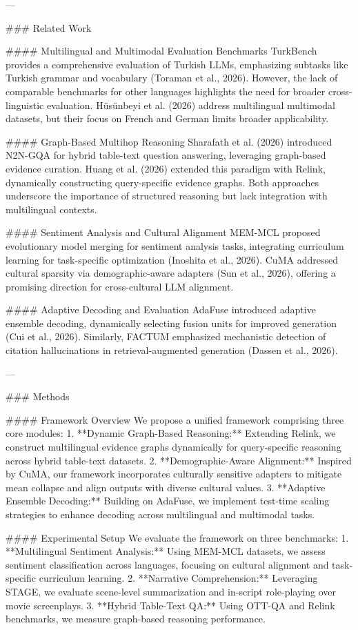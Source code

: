 ---

### Related Work

#### Multilingual and Multimodal Evaluation Benchmarks
TurkBench provides a comprehensive evaluation of Turkish LLMs, emphasizing subtasks like Turkish grammar and vocabulary (Toraman et al., 2026). However, the lack of comparable benchmarks for other languages highlights the need for broader cross-linguistic evaluation. Hüsünbeyi et al. (2026) address multilingual multimodal datasets, but their focus on French and German limits broader applicability.

#### Graph-Based Multihop Reasoning
Sharafath et al. (2026) introduced N2N-GQA for hybrid table-text question answering, leveraging graph-based evidence curation. Huang et al. (2026) extended this paradigm with Relink, dynamically constructing query-specific evidence graphs. Both approaches underscore the importance of structured reasoning but lack integration with multilingual contexts.

#### Sentiment Analysis and Cultural Alignment
MEM-MCL proposed evolutionary model merging for sentiment analysis tasks, integrating curriculum learning for task-specific optimization (Inoshita et al., 2026). CuMA addressed cultural sparsity via demographic-aware adapters (Sun et al., 2026), offering a promising direction for cross-cultural LLM alignment.

#### Adaptive Decoding and Evaluation
AdaFuse introduced adaptive ensemble decoding, dynamically selecting fusion units for improved generation (Cui et al., 2026). Similarly, FACTUM emphasized mechanistic detection of citation hallucinations in retrieval-augmented generation (Dassen et al., 2026).

---

### Methods

#### Framework Overview
We propose a unified framework comprising three core modules:
1. **Dynamic Graph-Based Reasoning:** Extending Relink, we construct multilingual evidence graphs dynamically for query-specific reasoning across hybrid table-text datasets.
2. **Demographic-Aware Alignment:** Inspired by CuMA, our framework incorporates culturally sensitive adapters to mitigate mean collapse and align outputs with diverse cultural values.
3. **Adaptive Ensemble Decoding:** Building on AdaFuse, we implement test-time scaling strategies to enhance decoding across multilingual and multimodal tasks.

#### Experimental Setup
We evaluate the framework on three benchmarks:
1. **Multilingual Sentiment Analysis:** Using MEM-MCL datasets, we assess sentiment classification across languages, focusing on cultural alignment and task-specific curriculum learning.
2. **Narrative Comprehension:** Leveraging STAGE, we evaluate scene-level summarization and in-script role-playing over movie screenplays.
3. **Hybrid Table-Text QA:** Using OTT-QA and Relink benchmarks, we measure graph-based reasoning performance.

